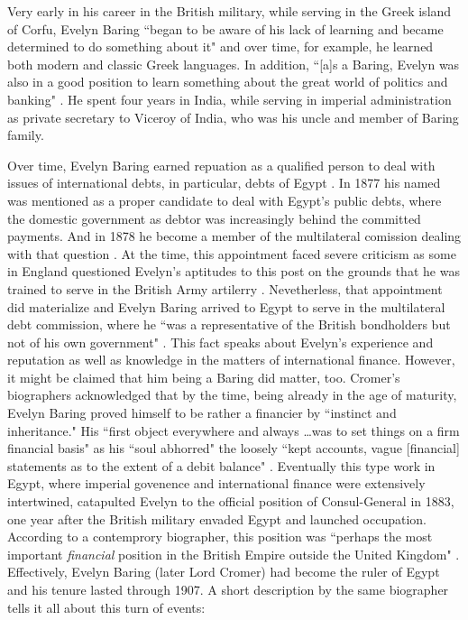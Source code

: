 Very early in his career in the British military, while serving in the Greek island of Corfu, Evelyn Baring ``began to be aware of his lack of learning and became determined to do something about it" and over time, for example, he learned both modern and classic Greek languages. In addition, ``[a]s a Baring, Evelyn was also in a good position to learn something about the great world of politics and banking" \citep[pp.~19-20,35]{roger2004}. He spent four years in India, while serving in imperial administration as private secretary to Viceroy of India, who was his uncle and member of Baring family. 

Over time, Evelyn Baring earned repuation as a qualified person to deal with issues of international debts, in particular, debts of Egypt \citep[p.~143-144]{tignor1963}. In 1877 his named was mentioned as a proper candidate to deal with Egypt's public debts, where the domestic government as debtor was increasingly behind the committed payments. And in 1878 he become a member of the multilateral comission dealing with that question \citep[p.~28]{primel2016}. At the time, this appointment faced severe criticism as some in England questioned Evelyn's aptitudes to this post on the grounds that he was trained to serve in the British Army artilerry \citep[p.~245]{courtney1918}. Nevetherless, that appointment did materialize and Evelyn Baring arrived to Egypt to serve in the multilateral debt commission, where he ``was a representative of the British bondholders but not of his own government" \citep[pp.~97]{roger2004}. This fact speaks about Evelyn's experience and reputation as well as knowledge in the matters of international finance. However, it might be claimed that him being a Baring did matter, too. Cromer's biographers acknowledged that by the time, being already in the age of maturity, Evelyn Baring proved himself to be rather a financier by ``instinct and inheritance." His ``first object everywhere and always \dots was to set things on a firm financial basis" as his ``soul abhorred" the loosely ``kept accounts, vague [financial] statements as to the extent of a debit balance" \citep[p.~252]{courtney1918}. Eventually this type work in Egypt, where imperial govenence and international finance were extensively intertwined, catapulted Evelyn to the official position of Consul-General in 1883, one year after the British military envaded Egypt and launched occupation. According to a contemprory biographer, this position was ``perhaps the most important \textit{financial} position in the British Empire outside the United Kingdom" \citep[p.~337, emphasis added]{traill1897}. Effectively, Evelyn Baring (later Lord Cromer) had become the ruler of Egypt and his tenure lasted through 1907. A short description by the same biographer tells it all about this turn of events:

